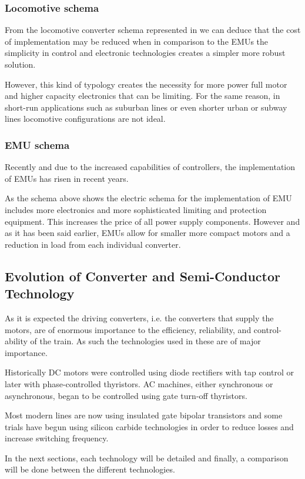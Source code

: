 \subsubsection{Locomotive schema}
From the locomotive converter schema represented in \cite{} we can deduce that the cost of implementation may be reduced when in comparison to the EMUs the simplicity in control and electronic technologies creates a simpler more robust solution. 

However, this kind of typology creates the necessity for more power full motor and higher capacity electronics that can be limiting. For the same reason, in short-run applications such as suburban lines or even shorter urban or subway lines locomotive configurations are not ideal.

\subsubsection{EMU schema}
Recently and due to the increased capabilities of controllers, the implementation of EMUs has risen in recent years.

As the schema above shows the electric schema for the implementation of EMU includes more electronics and more sophisticated limiting and protection equipment. This increases the price of all power supply components. However and as it has been said earlier, EMUs allow for smaller more compact motors and a reduction in load from each individual converter.

\subsection{Evolution of Converter and Semi-Conductor Technology}
As it is expected the driving converters, i.e. the converters that supply the motors, are of enormous importance to the efficiency, reliability, and control-ability of the train. As such the technologies used in these are of major importance. 

Historically DC motors were controlled using diode rectifiers with tap control or later with phase-controlled thyristors.
AC machines, either synchronous or asynchronous, began to be controlled using gate turn-off thyristors. 

Most modern lines are now using insulated gate bipolar transistors and some trials have begun using silicon carbide technologies in order to reduce losses and increase switching frequency.

In the next sections, each technology will be detailed and finally, a comparison will be done between the different technologies.

